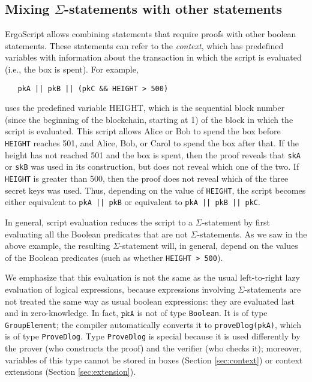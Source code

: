 \documentclass[11pt]{article}
\newcommand{\authnote}[2]{\marginpar{\parbox{\marginparwidth}{\tiny %
  \textsf{#1 {\textcolor{blue}{notes: #2}}}}}%
  \textcolor{blue}{\textbf{\dag}}}
\newcommand{\authnote}[2]{
  \textsf{#1 \textcolor{blue}{: #2}}}
\newcommand{\authnote}[2]{}
\newcommand{\lnote}[1]{{\authnote{\textcolor{orange}{Leo notes}}{#1}}}
\newcommand{\langname}{ErgoScript\xspace}
\begin{document}
\lnote{should probably do a diffie-hellman example, and maybe another one below with getting some of the DH values from a context. E.g., $g_1$ is just $g$, $g_2$ is $pk_A$, $h_1$ is a hash of a message in a context, and $h_2$ is from the context. }

\subsection{Mixing $\Sigma$-statements with other statements}
\langname allows combining statements that require proofs with other boolean statements. These statements can refer to the \emph{context}, which has predefined variables with information about the transaction in which the script is evaluated (i.e., the box is spent). For example,

\begin{verbatim}
   pkA || pkB || (pkC && HEIGHT > 500)
\end{verbatim}
uses the predefined variable HEIGHT, which is the sequential block number (since the beginning of the blockchain, starting at 1)
of the block in which the script is evaluated.
This script allows Alice or Bob to spend the box before \texttt{HEIGHT} reaches 501, and Alice, Bob, or Carol to spend the box after that. If the height has not reached 501 and the box is spent, then the proof reveals that \texttt{skA} or \texttt{skB} was used in its construction, but does not reveal which one of the two. If \texttt{HEIGHT} is greater than 500, then the proof does not reveal which of the three secret keys was used. Thus, depending on the value of \texttt{HEIGHT}, the script becomes either equivalent to \texttt{pkA || pkB} or equivalent to \texttt{pkA || pkB || pkC}.

In general, script evaluation reduces the script to a $\Sigma$-statement by first evaluating all the Boolean predicates that are not $\Sigma$-statements. As we saw in the above example, the resulting $\Sigma$-statement will, in general, depend on the values of the Boolean predicates (such as whether \texttt{HEIGHT > 500}).

We emphasize that this evaluation is not the same as the usual left-to-right lazy evaluation of logical expressions, because expressions involving $\Sigma$-statements are not treated the same way as usual boolean expressions: they are evaluated last and in zero-knowledge. In fact, $\texttt{pkA}$ is not of type \texttt{Boolean}. It is of type \texttt{GroupElement}; the compiler automatically converts it to \texttt{proveDlog(\texttt{pkA})}, which is of type \texttt{ProveDlog}. Type   \texttt{ProveDlog} is special because it is used differently by the prover (who constructs the proof) and the verifier (who checks it); moreover, variables of this type cannot be stored in boxes (Section \ref{sec:context}) or context extensions (Section \ref{sec:extension}). \lnote{the type system is undergoing changes, so this needs fixing}
\end{document}
